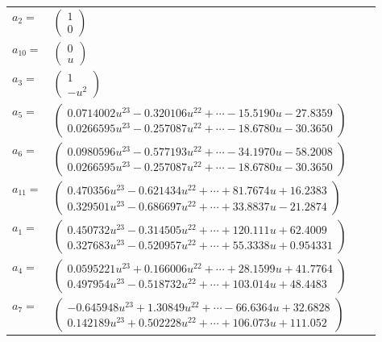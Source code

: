 \documentclass[1p]{elsarticle_modified}
\theoremstyle{definition}
\begin{document}
\begin{tabular}{m{7pt} m{180pt} m{7pt} m{180pt} }
\flushright $a_{2}=$&$\begin{pmatrix}1\\0\end{pmatrix}$ \\
\flushright $a_{10}=$&$\begin{pmatrix}0\\u\end{pmatrix}$ \\
\flushright $a_{3}=$&$\begin{pmatrix}1\\- u^2\end{pmatrix}$ \\
\flushright $a_{5}=$&$\begin{pmatrix}0.0714002 u^{23}-0.320106 u^{22}+\cdots-15.5190 u-27.8359\\0.0266595 u^{23}-0.257087 u^{22}+\cdots-18.6780 u-30.3650\end{pmatrix}$ \\
\flushright $a_{6}=$&$\begin{pmatrix}0.0980596 u^{23}-0.577193 u^{22}+\cdots-34.1970 u-58.2008\\0.0266595 u^{23}-0.257087 u^{22}+\cdots-18.6780 u-30.3650\end{pmatrix}$ \\
\flushright $a_{11}=$&$\begin{pmatrix}0.470356 u^{23}-0.621434 u^{22}+\cdots+81.7674 u+16.2383\\0.329501 u^{23}-0.686697 u^{22}+\cdots+33.8837 u-21.2874\end{pmatrix}$ \\
\flushright $a_{1}=$&$\begin{pmatrix}0.450732 u^{23}-0.314505 u^{22}+\cdots+120.111 u+62.4009\\0.327683 u^{23}-0.520957 u^{22}+\cdots+55.3338 u+0.954331\end{pmatrix}$ \\
\flushright $a_{4}=$&$\begin{pmatrix}0.0595221 u^{23}+0.166006 u^{22}+\cdots+28.1599 u+41.7764\\0.497954 u^{23}-0.518732 u^{22}+\cdots+103.014 u+48.4483\end{pmatrix}$ \\
\flushright $a_{7}=$&$\begin{pmatrix}-0.645948 u^{23}+1.30849 u^{22}+\cdots-66.6364 u+32.6828\\0.142189 u^{23}+0.502228 u^{22}+\cdots+106.073 u+111.052\end{pmatrix}$ \\

\end{tabular}
\end{document}
